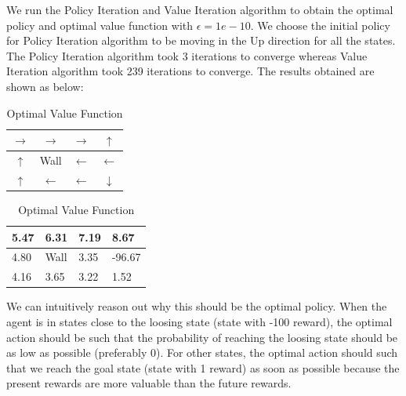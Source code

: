 \documentclass{article}
\begin{document}
\noindent %
We run the Policy Iteration and Value Iteration algorithm to obtain the optimal policy and optimal value function with $\epsilon = 1e-10$.
We choose the initial policy for Policy Iteration algorithm to be moving in the Up direction for all the states. The Policy 
Iteration algorithm took 3 iterations to converge whereas Value Iteration algorithm took 239 iterations to converge. The results 
obtained are shown as below:

\begin{table}[H]
    \renewcommand{\arraystretch}{2}
    \begin{minipage}{.5\textwidth}
        \begin{center}
        \begin{tabular}{ | c | c| c | c | } 
            \hline
            $\rightarrow$ & $\rightarrow$ & $\rightarrow$ & \cellcolor{green!25}$\uparrow$ \\ 
            \hline
            $\uparrow$ & \cellcolor{gray!50}Wall & $\leftarrow$ & \cellcolor{red!25}$\leftarrow$ \\ 
            \hline
            $\uparrow$ & $\leftarrow$ & $\leftarrow$ & $\downarrow$ \\ 
            \hline
        \end{tabular}
        \caption{Optimal Policy}
        \end{center}
    \end{minipage}%
    \begin{minipage}{.5\textwidth}
        \begin{center}
        \begin{tabular}{ | m{1cm} | m{1cm}| m{1cm} | m{1cm} | } 
            \hline
            5.47 & 6.31 & 7.19 & \cellcolor{green!25}8.67 \\ 
            \hline
            4.80 & \cellcolor{gray!50}Wall & 3.35 & \cellcolor{red!25}-96.67 \\ 
            \hline
            4.16 & 3.65 & 3.22 & 1.52 \\ 
            \hline
        \end{tabular}
        \caption{Optimal Value Function}
    \end{center}
    \end{minipage}%
    \renewcommand{\arraystretch}{1}
\end{table}
\noindent %
We can intuitively reason out why this should be the optimal policy. When the agent is in states close to the loosing state (state 
with -100 reward), the optimal action should be such that the probability of reaching the loosing state should be as low as 
possible (preferably 0). For other states, the optimal action should such that we reach the goal state (state with 1 reward) as soon
as possible because the present rewards are more valuable than the future rewards.
\end{document}
